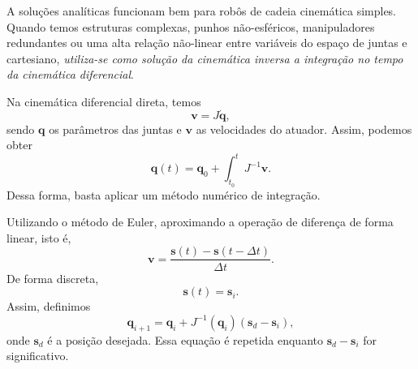 
A soluções analíticas funcionam bem para robôs de cadeia cinemática simples. Quando temos estruturas complexas, punhos não-esféricos, manipuladores redundantes ou uma alta relação não-linear entre variáveis do espaço de juntas e cartesiano, \emph{utiliza-se como solução da cinemática inversa a integração no tempo da cinemática diferencial}.

Na cinemática diferencial direta, temos \[
    \bm{v} = J \dot{\bm{q}}
,\] sendo $\bm{q}$ os parâmetros das juntas e $\bm{v}$ as velocidades do atuador. Assim, podemos obter \[
\bm{q}(t) = \bm{q}_0 + \int_{t_0}^{t} J^{-1} \bm{v}
.\] Dessa forma, basta aplicar um método numérico de integração.

Utilizando o método de Euler, aproximando a operação de diferença de forma linear, isto é, \[
\bm{v} = \frac{\bm{s}(t) - \bm{s}(t-\Delta t)}{\Delta t}
.\] De forma discreta, \[
\bm{s}(t) = \bm{s}_i
.\] Assim, definimos \[
\bm{q}_{i+1} = \bm{q}_i + J^{-1}\left( \bm{q}_i \right) \left( \bm{s}_d -\bm{s}_i \right) 
,\] onde $\bm{s}_d$ é a posição desejada. Essa equação é repetida enquanto $\bm{s}_d - \bm{s}_i$ for significativo.

